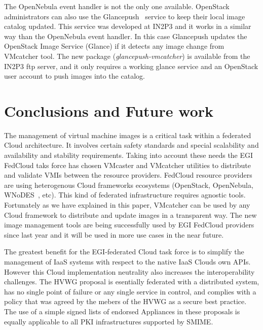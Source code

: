 \documentclass{cai}
\begin{document}
The OpenNebula event handler is not the only one available. OpenStack administrators can also use the Glancepush~\cite{glancepush} service to keep their local image catalog updated. 
This service was developed at IN2P3 and it works in a similar way than the OpenNebula event handler. 
In this case Glancepush updates the OpenStack Image Service (Glance) if it detects any image change from VMcatcher tool. 
The new package (\textit{glancepush-vmcatcher}) is available from the IN2P3 ftp server, and it only requires a working glance service and an OpenStack user account to push images into the catalog.


\section{Conclusions and Future work}
\label{sect-conclusions}
The management of virtual machine images is a critical task within a federated Cloud architecture. It involves certain safety standards and special scalability and availability and stability requirements.
Taking into account these needs the EGI FedCloud taks force has chosen VMcaster and VMcatcher utilities to distribute and validate VMIs between the resource providers.
FedCloud resource providers are using heterogenous Cloud frameworks ecosystems (OpenStack, OpenNebula, WNoDES~\cite{wnodes}, etc). This kind of federated infrastructure requires agnostic tools.
Fortunately as we have explained in this paper, VMcatcher can be used by any Cloud framework to distribute and update images in a transparent way. 
The new image management tools are being successfully used by EGI FedCloud providers since last year and it will be used in more use cases in the near future.

The greatest benefit for the EGI-federated Cloud task force is to simplify the management of IaaS systems with respect to the native IaaS Clouds own APIs. 
However this Cloud implementation neutrality also increases the interoperability challenges. 
The HVWG proposal is esentially federated with a distributed system, has no single point of failure or any single service in control, and complies with a policy that was agreed by the mebers of the HVWG as a secure best practice.
The use of a simple signed lists of endorsed Appliances in these proposals is equally applicable to all PKI infrastructures supported by SMIME. 
\end{document}
